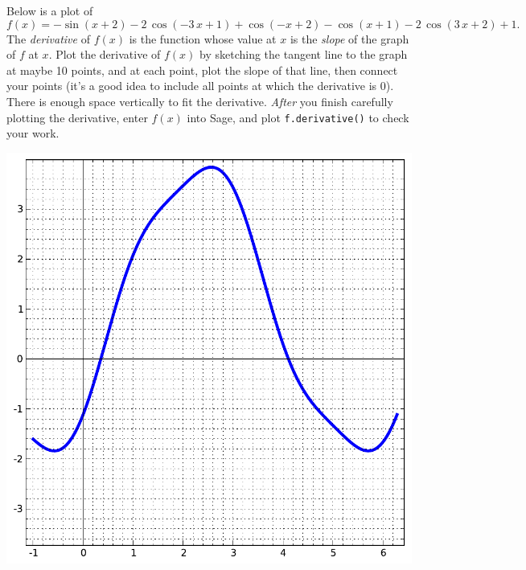 Below is a plot of $$f(x)=-\sin\left(x + 2\right) - 2 \, \cos\left(-3 \, x + 1\right) + \cos\left(-x + 2\right) - \cos\left(x + 1\right) - 2 \, \cos\left(3 \, x + 2\right) + 1.$$  The {\em \color{red}derivative} of $f(x)$ is the function whose value at $x$ is the {\em slope} of the graph of $f$ at $x$.  Plot the derivative of $f(x)$ by sketching the tangent line to the graph at maybe 10 points, and at each point, plot the slope of that line, then connect your points (it's a good idea to include all points at which the derivative is 0).  There is enough space vertically to fit the derivative.  {\em After} you finish carefully plotting the derivative, enter $f(x)$ into Sage, and plot {\color{blue}\verb|f.derivative()|} to check your work.
\begin{center}\includegraphics{functions/47.pdf}\end{center}\newpage

